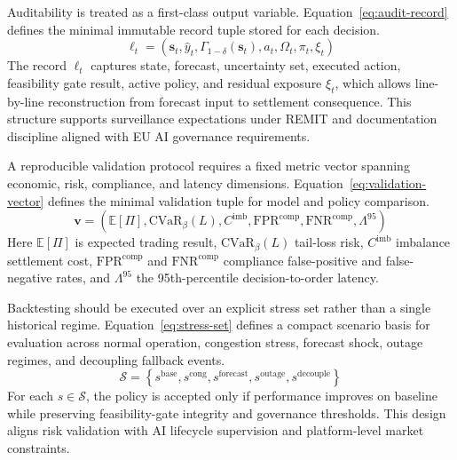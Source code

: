 \documentclass[oneside,10pt]{swissi}
\begin{document}
Auditability is treated as a first-class output variable. Equation~\eqref{eq:audit-record} defines the minimal immutable record tuple stored for each decision.
\begin{equation}
\ell_t=\left(\mathbf{s}_t,\hat{y}_t,\Gamma_{1-\delta}(\mathbf{s}_t),a_t,\Omega_t,\pi_t,\xi_t\right)
\label{eq:audit-record}
\end{equation}
The record $\ell_t$ captures state, forecast, uncertainty set, executed action, feasibility gate result, active policy, and residual exposure $\xi_t$, which allows line-by-line reconstruction from forecast input to settlement consequence. This structure supports surveillance expectations under REMIT and documentation discipline aligned with EU AI governance requirements.\cite{eu_reg_2011_1227_remit,eu_reg_2024_1689_ai_act}

A reproducible validation protocol requires a fixed metric vector spanning economic, risk, compliance, and latency dimensions. Equation~\eqref{eq:validation-vector} defines the minimal validation tuple for model and policy comparison.
\begin{equation}
\mathbf{v}=\left(\mathbb{E}[\Pi],\mathrm{CVaR}_{\beta}(L),C^{\mathrm{imb}},\mathrm{FPR}^{\mathrm{comp}},\mathrm{FNR}^{\mathrm{comp}},\Lambda^{95}\right)
\label{eq:validation-vector}
\end{equation}
Here $\mathbb{E}[\Pi]$ is expected trading result, $\mathrm{CVaR}_{\beta}(L)$ tail-loss risk, $C^{\mathrm{imb}}$ imbalance settlement cost, $\mathrm{FPR}^{\mathrm{comp}}$ and $\mathrm{FNR}^{\mathrm{comp}}$ compliance false-positive and false-negative rates, and $\Lambda^{95}$ the 95th-percentile decision-to-order latency.

Backtesting should be executed over an explicit stress set rather than a single historical regime. Equation~\eqref{eq:stress-set} defines a compact scenario basis for evaluation across normal operation, congestion stress, forecast shock, outage regimes, and decoupling fallback events.
\begin{equation}
\mathcal{S}=\left\{s^{\mathrm{base}},s^{\mathrm{cong}},s^{\mathrm{forecast}},s^{\mathrm{outage}},s^{\mathrm{decouple}}\right\}
\label{eq:stress-set}
\end{equation}
For each $s\in\mathcal{S}$, the policy is accepted only if performance improves on baseline while preserving feasibility-gate integrity and governance thresholds. This design aligns risk validation with AI lifecycle supervision and platform-level market constraints.\cite{nist_ai_rmf_2023,rockafellar_uryasev_2000_cvar,acer_market_coupling_development_2026}
\end{document}
